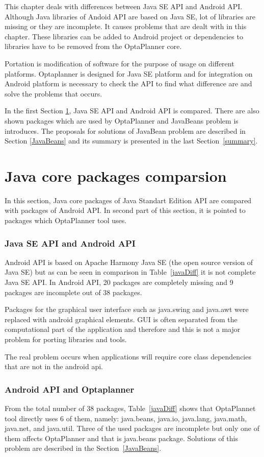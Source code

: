This chapter deals with differences between Java SE API and Android API. Although Java libraries of Andoid API are based on Java SE, lot of libraries are missing or they are incomplete. It causes problems that are dealt with in this chapter. These libraries can be added to Android project or dependencies to libraries have to be removed from the OptaPlanner core.

Portation is modification of software for the purpose of usage on different platforms. Optaplanner is designed for Java SE platform and for integration on Android platform is necessary to check the API to find what difference are and solve the problems that occurs.

In the first Section \ref{comparsion}, Java SE API and Android API is compared. There are also shown packages which are used by OptaPlanner and JavaBeans problem is introduces. The proposals for solutions of JavaBean problem are described in Section \ref{JavaBeans} and its summary is presented in the last Section~\ref{summary}.

\section{Java core packages comparsion}\label{comparsion}
In this section, Java core packages of Java Standart Edition API are compared with packages of Android API. In second part of this section, it is pointed to packages which OptaPlanner tool uses.

\subsubsection{Java SE API and Android API}\label{apis}
Android API is based on Apache Harmony Java SE (the open source version of Java SE) but as can be seen in comparison in Table~\ref{javaDiff} it is not complete Java SE API. In Android API, 20 packages are completely missing and 9 packages are incomplete out of 38 packages.

Packages for the graphical user interface such as java.swing and java.awt were replaced with android graphical elements. GUI is often separated from the computational part of the application and therefore and this is not a major problem for porting libraries and tools.

The real problem occurs when applications will require core class dependencies that are not in the android api.

\subsubsection{Android API and Optaplanner}
From the total number of 38 packages, Table~\ref{javaDiff} shows that OptaPlannet tool directly uses 6 of them, namely: java.beans, java.io, java.lang, java.math, java.net, and java.util. Three of the used packages are incomplete but only one of them affects OptaPlanner and that is java.beans package. Solutions of this problem are described in the Section~\ref{JavaBeans}.

